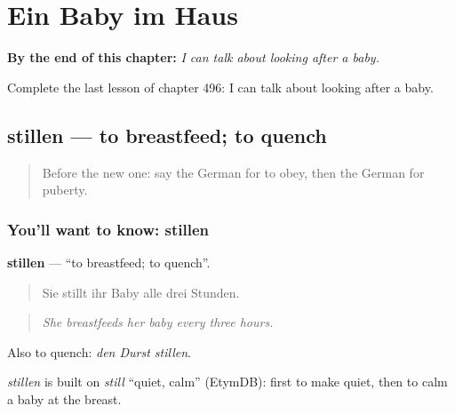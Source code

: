 
\chapter{Ein Baby im Haus}
\label{ch:ge-ein-baby-im-haus}

\begin{chapteropening}
\textbf{By the end of this chapter:} \emph{I can talk about looking after a baby.}

Complete the last lesson of chapter 496: I can talk about looking after a baby.
\end{chapteropening}

\section[stillen]{stillen — to breastfeed; to quench}

\label{lesson:GE-C496-stillen}



\begin{quote}
Before the new one: say the German for to obey, then the German for puberty.
\end{quote}

\subsection*{You'll want to know: stillen}
\textbf{stillen} — \textquotedblleft{}to breastfeed; to quench\textquotedblright{}.

\begin{quote}
Sie stillt ihr Baby alle drei Stunden.
\end{quote}

\begin{quote}
\emph{She breastfeeds her baby every three hours.}
\end{quote}

Also to quench: \emph{den Durst stillen}.

\begin{cousinweb}
\emph{stillen} is built on \emph{still} \textquotedblleft{}quiet, calm\textquotedblright{} (EtymDB): first to make quiet, then to calm a baby at the breast.
\end{cousinweb}

